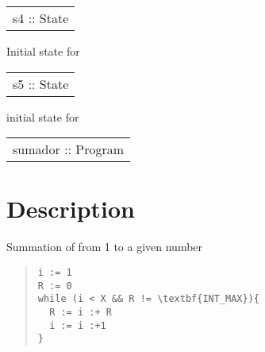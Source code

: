 \begin{haddockdesc}
\item[\begin{tabular}{@{}l}
s4 :: State
\end{tabular}]
{\haddockbegindoc
Initial state for \par}
\end{haddockdesc}
\begin{haddockdesc}
\item[\begin{tabular}{@{}l}
s5 :: State
\end{tabular}]
{\haddockbegindoc
initial state for \par}
\end{haddockdesc}
\begin{haddockdesc}
\item[\begin{tabular}{@{}l}
sumador :: Program
\end{tabular}]
{\haddockbegindoc
\section*{Description}
Summation of from 1 to a given number\par
\begin{quote}
{\haddockverb\begin{verbatim}
i := 1
R := 0
while (i < X && R != \textbf{INT_MAX}){
  R := i :+ R
  i := i :+1
}
\end{verbatim}}
\end{quote}}
\end{haddockdesc}
